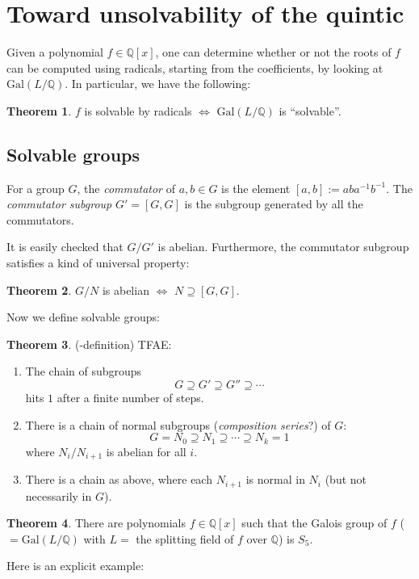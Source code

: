 \documentclass{article}
\newcommand{\Q}{\mathbb Q}
\newcommand{\gal}[2]{\text{Gal}(#1/#2)}
\newcommand{\iv}[1]{#1^{-1}}
\theoremstyle{definition}
\newtheorem*{thm}{Theorem}
\begin{document}
\section{Toward unsolvability of the quintic}
Given a polynomial $f\in\Q[x]$, one can determine whether or not the roots of
$f$ can be computed using radicals, starting from the coefficients, by looking
at $\gal L \Q$. In particular, we have the following:
\begin{thm}
  $f$ is solvable by radicals $\iff$ $\gal L \Q$ is ``solvable''.
\end{thm}

\subsection{Solvable groups}
For a group $G$, the \textit{commutator} of $a,b\in G$ is the element $[a,b]:= ab\iv a\iv
b$. The \textit{commutator subgroup} $G' = [G,G]$ is the subgroup generated by
all the commutators.

It is easily checked that $G/G'$ is abelian. Furthermore, the commutator
subgroup satisfies a kind of universal property:

\begin{thm}
 $G/N$ is abelian $\iff$ $N\supseteq [G,G]$. 
\end{thm}

Now we define solvable groups:
\begin{thm}(-definition)
  TFAE:
  \begin{enumerate}
  \item The chain of subgroups
    $$G \supseteq G' \supseteq G''\supseteq\cdots$$
    hits $1$ after a finite number of steps.
  \item There is a chain of normal subgroups (\textit{composition series}?) of
    $G$:
    $$G=N_0 \supseteq N_1 \supseteq \cdots \supseteq N_k = 1$$
    where $N_i/N_{i+1}$ is abelian for all $i$.
  
  \item There is a chain as above, where each $N_{i+1}$ is normal in $N_i$ (but not
    necessarily in $G$). 
  \end{enumerate}
\end{thm}
\begin{thm}
 There are polynomials $f\in\Q[x]$ such that the Galois group of $f$ ($=\gal
 {L} \Q$ with $L = $ the splitting field of $f$ over $\Q$) is $S_5$. 
\end{thm}

Here is an explicit example:
\end{document}
